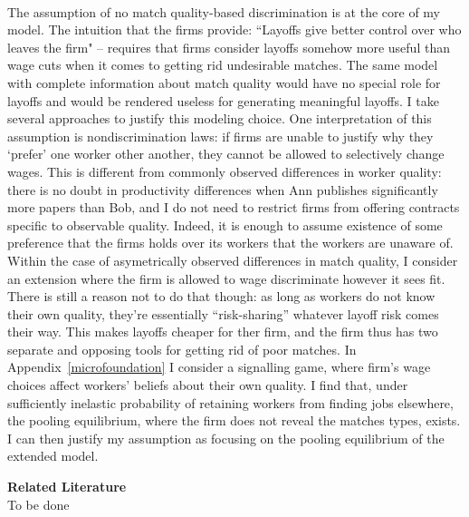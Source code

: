 \\
The assumption of no match quality-based discrimination is at the core of my model. The intuition that the firms provide: ``Layoffs give better control over who leaves the firm" -- requires that firms consider layoffs somehow more useful than wage cuts when it comes to getting rid undesirable matches. The same model with complete information about match quality would have no special role for layoffs and would be rendered useless for generating meaningful layoffs. I take several approaches to justify this modeling choice. One interpretation of this assumption is nondiscrimination laws: if firms are unable to justify why they `prefer' one worker other another, they cannot be allowed to selectively change wages. This is different from commonly observed differences in worker quality: there is no doubt in productivity differences when Ann publishes significantly more papers than Bob, and I do not need to restrict firms from offering contracts specific to observable quality. Indeed, it is enough to assume existence of some preference that the firms holds over its workers that the workers are unaware of. \\ 
Within the case of asymetrically observed differences in match quality, I consider an extension where the firm is allowed to wage discriminate however it sees fit. There is still a reason not to do that though: as long as workers do not know their own quality, they're essentially ``risk-sharing'' whatever layoff risk comes their way. This makes layoffs cheaper for ther firm, and the firm thus has two separate and opposing tools for getting rid of poor matches. In Appendix~\ref{microfoundation} I consider a signalling game, where firm's wage choices affect workers' beliefs about their own quality. I find that, under sufficiently inelastic probability of retaining workers from finding jobs elsewhere, the pooling equilibrium, where the firm does not reveal the matches types, exists. I can then justify my assumption as focusing on the pooling equilibrium of the extended model.



\textbf{Related Literature} \\
To be done